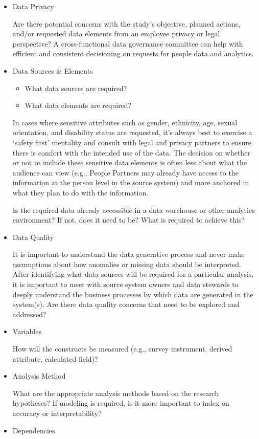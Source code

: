 \documentclass[]{book}
\providecommand{\tightlist}{%
  \setlength{\itemsep}{0pt}\setlength{\parskip}{0pt}}
\begin{document}
\begin{itemize}
\item
  Data Privacy

  Are there potential concerns with the study's objective, planned actions, and/or requested data elements from an employee privacy or legal perspective? A cross-functional data governance committee can help with efficient and consistent decisioning on requests for people data and analytics.
\item
  Data Sources \& Elements

  \begin{itemize}
  \tightlist
  \item
    What data sources are required?
  \item
    What data elements are required?
  \end{itemize}

  In cases where sensitive attributes such as gender, ethnicity, age, sexual orientation, and disability status are requested, it's always best to exercise a `safety first' mentality and consult with legal and privacy partners to ensure there is comfort with the intended use of the data. The decision on whether or not to include these sensitive data elements is often less about what the audience can view (e.g., People Partners may already have access to the information at the person level in the source system) and more anchored in what they plan to do with the information.

  Is the required data already accessible in a data warehouse or other analytics environment? If not, does it need to be? What is required to achieve this?
\item
  Data Quality

  It is important to understand the data generative process and never make assumptions about how anomalies or missing data should be interpreted. After identifying what data sources will be required for a particular analysis, it is important to meet with source system owners and data stewards to deeply understand the business processes by which data are generated in the system(s). Are there data quality concerns that need to be explored and addressed?
\item
  Variables

  How will the constructs be measured (e.g., survey instrument, derived attribute, calculated field)?
\item
  Analysis Method

  What are the appropriate analysis methods based on the research hypotheses? If modeling is required, is it more important to index on accuracy or interpretability?
\item
  Dependencies


\end{itemize}
\end{document}
